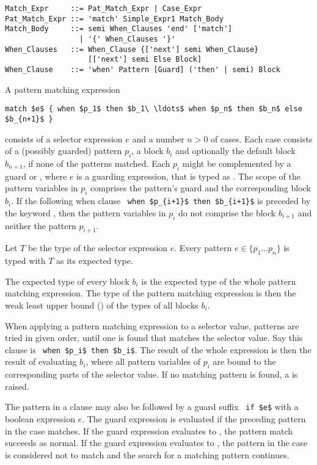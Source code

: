 \syntax\begin{lstlisting}
Match_Expr     ::= Pat_Match_Expr | Case_Expr
Pat_Match_Expr ::= 'match' Simple_Expr1 Match_Body
Match_Body     ::= semi When_Clauses 'end' ['match']
                 | '{' When_Clauses '}'
When_Clauses   ::= When_Clause {['next'] semi When_Clause} 
                   [['next'] semi Else Block]
When_Clause    ::= 'when' Pattern [Guard] ('then' | semi) Block
\end{lstlisting}

A pattern matching expression 
\begin{lstlisting}
match $e$ { when $p_1$ then $b_1\ \ldots$ when $p_n$ then $b_n$ else $b_{n+1}$ }
\end{lstlisting}
consists of a selector expression $e$ and a number $n > 0$ of cases. Each case consists of a (possibly guarded) pattern $p_i$, a block $b_i$ and optionally the default block $b_{n+1}$, if none of the patterns matched. Each $p_i$ might be complemented by a guard  or , where $e$ is a guarding expression, that is typed as . The scope of the pattern variables in $p_i$ comprises the pattern's guard and the corresponding block $b_i$. If the following when clause ~\lstinline!when $p_{i+1}$ then $b_{i+1}$! is preceded by the keyword , then the pattern variables in $p_i$ do not comprise the block $b_{i+1}$ and neither the pattern $p_{i+1}$. 

Let $T$ be the type of the selector expression $e$. Every pattern $e \in \{ p_1 \ldots p_n \}$ is typed with $T$ as its expected type. 

The expected type of every block $b_i$ is the expected type of the whole pattern matching expression. The type of the pattern matching expression is then the weak least upper bound () of the types of all blocks $b_i$. 

When applying a pattern matching expression to a selector value, patterns are tried in given order, until one is found that matches the selector value. Say this  clause is ~\lstinline!when $p_i$ then $b_i$!. The result of the whole expression is then the result of evaluating $b_i$, where all pattern variables of $p_i$ are bound to the corresponding parts of the selector value. If no matching pattern is found, a  is raised. 

The pattern in a  clause may also be followed by a guard suffix ~\lstinline!if $e$! with a boolean expression $e$. The guard expression is evaluated if the preceding pattern in the case matches. If the guard expression evaluates to , the pattern match succeeds as normal. If the guard expression evaluates to , the pattern in the case is considered not to match and the search for a matching pattern continues. 

